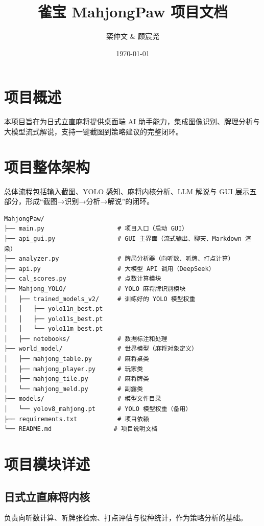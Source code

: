 \documentclass[12pt]{article}
\title{雀宝 MahjongPaw 项目文档}
\author{栾仲文 \& 顾宸尧}
\date{\today}
\begin{document}
\maketitle
\tableofcontents
\newpage

\section{项目概述}
本项目旨在为日式立直麻将提供桌面端 AI 助手能力，集成图像识别、牌理分析与大模型流式解说，支持一键截图到策略建议的完整闭环。

\section{项目整体架构}
总体流程包括输入截图、YOLO 感知、麻将内核分析、LLM 解说与 GUI 展示五部分，形成“截图→识别→分析→解说”的闭环。

\begin{lstlisting}
MahjongPaw/
├── main.py                    # 项目入口（启动 GUI）
├── api_gui.py                 # GUI 主界面（流式输出、聊天、Markdown 渲染）
├── analyzer.py                # 牌局分析器（向听数、听牌、打点计算）
├── api.py                     # 大模型 API 调用（DeepSeek）
├── cal_scores.py              # 点数计算模块
├── Mahjong_YOLO/              # YOLO 麻将牌识别模块
│   ├── trained_models_v2/     # 训练好的 YOLO 模型权重
│   │   ├── yolo11n_best.pt
│   │   ├── yolo11s_best.pt
│   │   └── yolo11m_best.pt
│   ├── notebooks/             # 数据标注和处理
├── world_model/               # 世界模型（麻将对象定义）
│   ├── mahjong_table.py       # 麻将桌类
│   ├── mahjong_player.py      # 玩家类
│   ├── mahjong_tile.py        # 麻将牌类
│   └── mahjong_meld.py        # 副露类
├── models/                    # 模型文件目录
│   └── yolov8_mahjong.pt      # YOLO 模型权重（备用）
├── requirements.txt           # 项目依赖
└── README.md                 # 项目说明文档
\end{lstlisting}

\section{项目模块详述}
\subsection{日式立直麻将内核}
负责向听数计算、听牌张检索、打点评估与役种统计，作为策略分析的基础。
\end{document}
